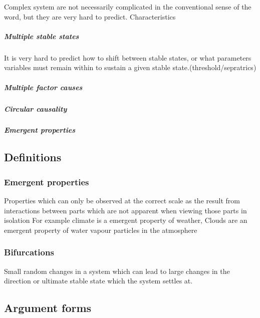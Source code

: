 \documentclass[]{article}
\let\oldsubparagraph\subparagraph
\renewcommand{\subparagraph}[1]{\oldsubparagraph{#1}\mbox{}}
\begin{document}
Complex system are not necessarily complicated in the conventional sense
of the word, but they are very hard to predict. Characteristics

\hypertarget{multiple-stable-states}{%
\subparagraph{Multiple stable states}\label{multiple-stable-states}}

It is very hard to predict how to shift between stable states, or what
parameters variables must remain within to sustain a given stable
state.(threshold/sepratrics)

\hypertarget{multiple-factor-causes}{%
\subparagraph{Multiple factor causes}\label{multiple-factor-causes}}

\hypertarget{circular-causality}{%
\subparagraph{Circular causality}\label{circular-causality}}

\hypertarget{emergent-properties}{%
\subparagraph{Emergent properties}\label{emergent-properties}}

\hypertarget{definitions}{%
\subsection{Definitions}\label{definitions}}

\hypertarget{emergent-properties-1}{%
\subsubsection{Emergent properties}\label{emergent-properties-1}}

Properties which can only be observed at the correct scale as the result
from interactions between parts which are not apparent when viewing
those parts in isolation For example climate is a emergent property of
weather, Clouds are an emergent property of water vapour particles in
the atmosphere

\hypertarget{bifurcations}{%
\subsubsection{Bifurcations}\label{bifurcations}}

Small random changes in a system which can lead to large changes in the
direction or ultimate stable state which the system settles at.

\hypertarget{argument-forms}{%
\subsection{Argument forms}\label{argument-forms}}
\end{document}
